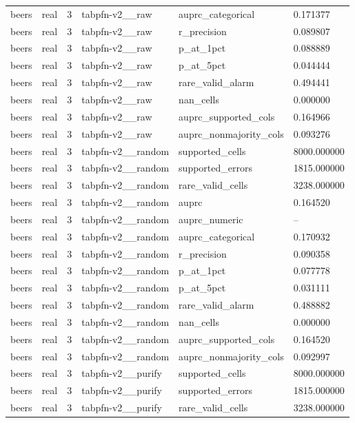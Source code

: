 \begin{tabular}{llllll}
beers & real & 3 & tabpfn-v2\_\_raw & auprc\_categorical & 0.171377 \\
beers & real & 3 & tabpfn-v2\_\_raw & r\_precision & 0.089807 \\
beers & real & 3 & tabpfn-v2\_\_raw & p\_at\_1pct & 0.088889 \\
beers & real & 3 & tabpfn-v2\_\_raw & p\_at\_5pct & 0.044444 \\
beers & real & 3 & tabpfn-v2\_\_raw & rare\_valid\_alarm & 0.494441 \\
beers & real & 3 & tabpfn-v2\_\_raw & nan\_cells & 0.000000 \\
beers & real & 3 & tabpfn-v2\_\_raw & auprc\_supported\_cols & 0.164966 \\
beers & real & 3 & tabpfn-v2\_\_raw & auprc\_nonmajority\_cols & 0.093276 \\
beers & real & 3 & tabpfn-v2\_\_random & supported\_cells & 8000.000000 \\
beers & real & 3 & tabpfn-v2\_\_random & supported\_errors & 1815.000000 \\
beers & real & 3 & tabpfn-v2\_\_random & rare\_valid\_cells & 3238.000000 \\
beers & real & 3 & tabpfn-v2\_\_random & auprc & 0.164520 \\
beers & real & 3 & tabpfn-v2\_\_random & auprc\_numeric & -- \\
beers & real & 3 & tabpfn-v2\_\_random & auprc\_categorical & 0.170932 \\
beers & real & 3 & tabpfn-v2\_\_random & r\_precision & 0.090358 \\
beers & real & 3 & tabpfn-v2\_\_random & p\_at\_1pct & 0.077778 \\
beers & real & 3 & tabpfn-v2\_\_random & p\_at\_5pct & 0.031111 \\
beers & real & 3 & tabpfn-v2\_\_random & rare\_valid\_alarm & 0.488882 \\
beers & real & 3 & tabpfn-v2\_\_random & nan\_cells & 0.000000 \\
beers & real & 3 & tabpfn-v2\_\_random & auprc\_supported\_cols & 0.164520 \\
beers & real & 3 & tabpfn-v2\_\_random & auprc\_nonmajority\_cols & 0.092997 \\
beers & real & 3 & tabpfn-v2\_\_purify & supported\_cells & 8000.000000 \\
beers & real & 3 & tabpfn-v2\_\_purify & supported\_errors & 1815.000000 \\
beers & real & 3 & tabpfn-v2\_\_purify & rare\_valid\_cells & 3238.000000 \\

\end{tabular}
